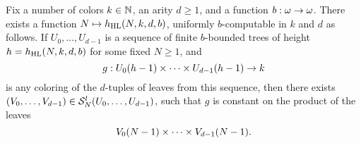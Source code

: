 \begin{lemma}\label{lem:finitary-strong-hl-tuple}
	Fix a number of colors $k \in \mathbb{N}$, an arity $d \geq 1$, and a function $b:\omega\to\omega$. There exists a function $N \mapsto h_{\mathrm{HL}}(N, k, d, b)$, uniformly $b$-computable in $k$ and $d$ as follows.
  If $U_0,\dots, U_{d-1}$ is a sequence of finite $b$-bounded trees of height $h=h_{\mathrm{HL}}(N,k,d,b)$ for some fixed $N \geq 1$, and
  \[g:{U}_0(h-1) \times \dots \times {U}_{d-1}(h-1)\to k\]
  is any coloring of the $d$-tuples of leaves from this sequence, then there exists %
  $(V_0,\dots,V_{d-1})\in\mathcal{S}^{l}_{N}({U_0,\dots, U_{d-1}})$, %
  such that $g$ is constant on the product of the leaves
  \[{V}_0(N-1) \times \dots \times {V}_{d-1}(N-1).\]
\end{lemma}
